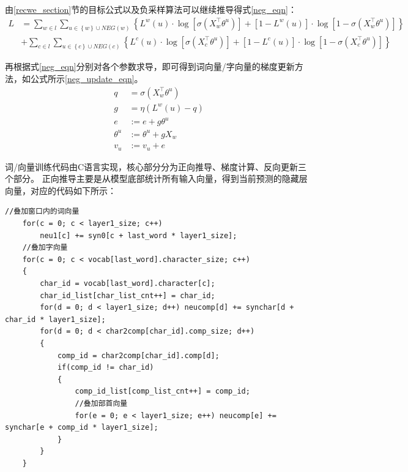 由\ref{recwe_section}节的目标公式以及负采样算法可以继续推导得式\ref{neg_eqn}：
\begin{equation}
    \begin{aligned}
        L &= \sum_{w\in l}\sum_{u\in \left \{ w \right \}\cup NEG\left ( w \right )}\left \{ L^w\left ( u \right ) \cdot \log \left [ \sigma \left ( X_w^{\top }\theta^u  \right ) \right ]+\left [ 1-  L^w\left ( u \right )\right ]\cdot \log \left [1- \sigma \left ( X_w^{\top }\theta^u  \right ) \right ]\right \} \\
        &+ \sum_{c\in l}\sum_{u\in \left \{ c \right \}\cup NEG\left ( c \right )}\left \{ L^c\left ( u \right ) \cdot \log \left [ \sigma \left ( X_c^{\top }\theta^u  \right ) \right ]+\left [ 1-  L^c\left ( u \right )\right ]\cdot \log \left [1- \sigma \left ( X_c^{\top }\theta^u  \right ) \right ]\right \}
    \end{aligned}
    \label{neg_eqn}
\end{equation}

再根据式\ref{neg_eqn}分别对各个参数求导，即可得到词向量/字向量的梯度更新方法，如公式所示\ref{neg_update_eqn}。
\begin{equation}
    \begin{aligned}
        q&=\sigma \left ( X_w^\top \theta^u \right )\\
        g&=\eta \left ( L^w\left ( u \right )-q \right )\\
        e &:=e+g\theta^u\\
        \theta^u &:=\theta^u+gX_w\\
        v_u &:=v_u+e
    \end{aligned}
    \label{neg_update_eqn}
\end{equation}

词/向量训练代码由C语言实现，核心部分分为正向推导、梯度计算、反向更新三个部分。
正向推导主要是从模型底部统计所有输入向量，得到当前预测的隐藏层向量，对应的代码如下所示：
\begin{lstlisting}[language={[ANSI]C},frame=shadowbox,rulesepcolor=\color{red!0!green!0!blue!0}] 
    //叠加窗口内的词向量
    for(c = 0; c < layer1_size; c++) 
        neu1[c] += syn0[c + last_word * layer1_size];
    //叠加字向量
    for(c = 0; c < vocab[last_word].character_size; c++)
    {
        char_id = vocab[last_word].character[c];
        char_id_list[char_list_cnt++] = char_id;
        for(d = 0; d < layer1_size; d++) neucomp[d] += synchar[d + char_id * layer1_size];
        for(d = 0; d < char2comp[char_id].comp_size; d++)
        {
            comp_id = char2comp[char_id].comp[d];
            if(comp_id != char_id)
            {
                comp_id_list[comp_list_cnt++] = comp_id;
                //叠加部首向量
                for(e = 0; e < layer1_size; e++) neucomp[e] += synchar[e + comp_id * layer1_size];
            }
        }
    }
\end{lstlisting}

